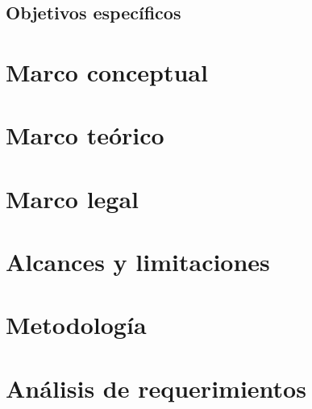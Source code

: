 \documentclass[letter,12pt]{book}
\begin{document}
  \section{Objetivos específicos}
   

  \chapter{Marco conceptual}
  
 
  \chapter{Marco teórico}
  
  
  \chapter{Marco legal}
  
  
  \chapter{Alcances y limitaciones}
  
  
  \chapter{Metodología}
  

%  
  
  \chapter{Análisis de requerimientos}
    
  
  
\end{document}
